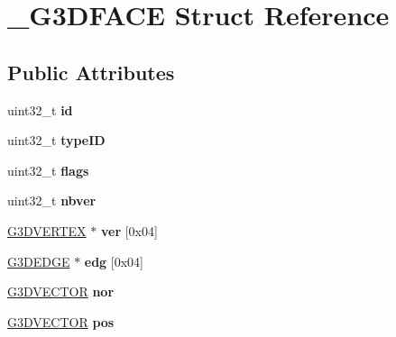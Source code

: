 \hypertarget{struct__G3DFACE}{}\section{\+\_\+\+G3\+D\+F\+A\+CE Struct Reference}
\label{struct__G3DFACE}
\subsection*{Public Attributes}
\begin{DoxyCompactItemize}
\item 
\mbox{\label{struct__G3DFACE_ae10b83424eb0939005590f31b78910eb}} 
uint32\+\_\+t {\bfseries id}
\item 
\mbox{\label{struct__G3DFACE_a68c696f5d24a5ce59c7ee37688211836}} 
uint32\+\_\+t {\bfseries type\+ID}
\item 
\mbox{\label{struct__G3DFACE_a35a4fbdceaadc3c7cf024ecec302b371}} 
uint32\+\_\+t {\bfseries flags}
\item 
\mbox{\label{struct__G3DFACE_a64a01bc4049fed54748678b4c36077ae}} 
uint32\+\_\+t {\bfseries nbver}
\item 
\mbox{\label{struct__G3DFACE_acd95898a76a2fc25951abbbf78b8d047}} 
\hyperlink{struct__G3DVERTEX}{G3\+D\+V\+E\+R\+T\+EX} $\ast$ {\bfseries ver} \mbox{[}0x04\mbox{]}
\item 
\mbox{\label{struct__G3DFACE_a774ff08e897703a0b924581e42e4cae6}} 
\hyperlink{struct__G3DEDGE}{G3\+D\+E\+D\+GE} $\ast$ {\bfseries edg} \mbox{[}0x04\mbox{]}
\item 
\mbox{\label{struct__G3DFACE_aa6613ede300190edbbd61860698ff6de}} 
\hyperlink{structG3DVECTOR}{G3\+D\+V\+E\+C\+T\+OR} {\bfseries nor}
\item 
\mbox{\label{struct__G3DFACE_a4bb74ffc64abc1d7814d99bb69f72363}} 
\hyperlink{structG3DVECTOR}{G3\+D\+V\+E\+C\+T\+OR} {\bfseries pos}
\item 
\mbox{\label{struct__G3DFACE_a6dc9f58397b139cafd5652b49b9ee132}} 

\end{DoxyCompactItemize}
